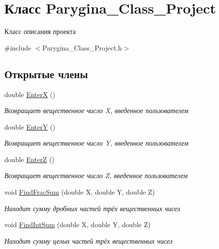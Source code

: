 \hypertarget{class_parygina___class___project}{\section{Класс Parygina\+\_\+\+Class\+\_\+\+Project}
\label{class_parygina___class___project}
}


Класс описания проекта  




{\ttfamily \#include $<$Parygina\+\_\+\+Class\+\_\+\+Project.\+h$>$}

\subsection*{Открытые члены}
\begin{DoxyCompactItemize}
\item 
double \hyperlink{class_parygina___class___project_a6f7696b027d636e7df484177bcc40b2d}{Enter\+X} ()
\begin{DoxyCompactList}\small\item\em Возвращает вещественное число X, введенное пользователем \end{DoxyCompactList}\item 
double \hyperlink{class_parygina___class___project_a46016c54586f7375dbcd87cc6feb4dde}{Enter\+Y} ()
\begin{DoxyCompactList}\small\item\em Возвращает вещественное число Y, введенное пользователем \end{DoxyCompactList}\item 
double \hyperlink{class_parygina___class___project_ae6788795e8f70042aff548f3413584a4}{Enter\+Z} ()
\begin{DoxyCompactList}\small\item\em Возвращает вещественное число Z, введенное пользователем \end{DoxyCompactList}\item 
void \hyperlink{class_parygina___class___project_a01eeb3502264668a4b35ab3df04df251}{Find\+Frac\+Sum} (double X, double Y, double Z)
\begin{DoxyCompactList}\small\item\em Находит сумму дробных частей трёх вещественных чисел \end{DoxyCompactList}\item 
void \hyperlink{class_parygina___class___project_a31be67ffc39234e9058ba84985f3c9b0}{Find\+Int\+Sum} (double X, double Y, double Z)
\begin{DoxyCompactList}\small\item\em Находит сумму целых частей трёх вещественных чисел \end{DoxyCompactList}\end{DoxyCompactItemize}
